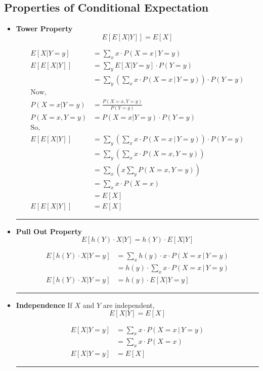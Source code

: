 \documentclass[twoside]{article}
\newenvironment{proof}{{\bf Proof:}}{\hfill\rule{2mm}{2mm}}
\begin{document}
\subsection{Properties of Conditional Expectation}
\begin{itemize}
   \item{\bf Tower Property}
   \[
      E[E[X | Y]] = E[X]
   \]

   \begin{proof}
      \begin{align*}
         E[X | Y = y] &= \sum_x x \cdot P(X = x \, | \, Y = y) \\
         E[E[X | Y]] &= \sum_y E[X | Y = y] \cdot P(Y = y) \\
         &= \sum_y \left (\sum_x x \cdot P(X = x \, | \, Y = y)\right ) \cdot P(Y = y) \\
         \text{Now,} \\
         P(X = x | Y = y) &= \frac {P(X = x, Y = y)} {P(Y = y)} \\
         P(X = x, Y = y) &= P(X = x | Y = y) \cdot P(Y = y) \\
         \text{So,} \\
         E[E[X | Y]] &= \sum_y \left (\sum_x x \cdot P(X = x \, | \, Y = y)\right ) \cdot P(Y = y) \\
         &= \sum_y \left (\sum_x x \cdot P(X = x, Y = y) \right ) \\
         &= \sum_x \left (x \sum_y P(X = x, Y = y) \right ) \\
         &= \sum_x x \cdot P(X = x) \\
         &= E[X] \\
         E[E[X | Y]] &= E[X]
      \end{align*}
   \end{proof}

   \item {\bf Pull Out Property}
   \[
      E[h(Y) \cdot X | Y] = h(Y) \cdot E[X | Y]
   \]

   \begin{proof}
      \begin{align*}
         E[h(Y) \cdot X | Y = y] &= \sum_x h(y) \cdot x \cdot P(X = x \, | \, Y = y) \\
         &= h(y) \cdot \sum_x x \cdot P(X = x \, | \, Y = y) \\
         E[h(Y) \cdot X | Y = y] &= h(y) \cdot E[X | Y = y]
      \end{align*}
   \end{proof}

   \item {\bf Independence}
   If $X$ and $Y$ are independent,
   \[
      E[X | Y] = E[X]
   \]

   \begin{proof}
      \begin{align*}
         E[X | Y = y] &= \sum_x x \cdot P(X = x \, | \, Y = y) \\
         &= \sum_x x \cdot P(X = x) \\
         E[X | Y = y] &= E[X]
      \end{align*}
   \end{proof}
\end{itemize}
\end{document}
